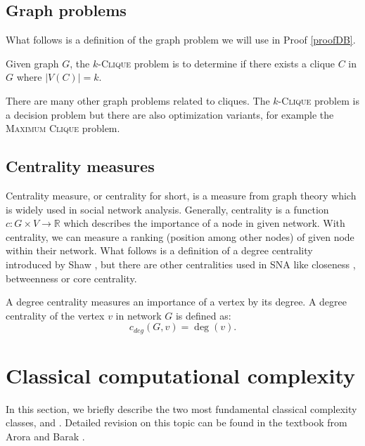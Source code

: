 \subsection{Graph problems}

What follows is a definition of the \NPh graph problem we will use in Proof \ref{proofDB}.

\begin{definition}
    Given graph $G$, the $k$-\textsc{Clique} problem is to determine if
    there exists a clique $C$ in $G$ where $|V(C)| = k$.
\end{definition}

There are many other graph problems related to cliques. The $k$-\textsc{Clique} problem is a decision problem but
there are also optimization variants, for example the \textsc{Maximum Clique} problem.


\subsection{Centrality measures}

Centrality measure, or centrality for short, is a measure from graph theory which is widely used in social network analysis.
Generally, centrality is a function $c: G \times V \rightarrow \mathbb{R}$ which describes the importance of a node in given network.
With centrality, we can measure a ranking (position among other nodes) of given node within their network.
What follows is a definition of a degree centrality introduced by Shaw \cite{Shaw1954}, but there are other centralities used in SNA like
closeness \cite{Beauchamp1965}, betweenness \cite{Anthonisse1971,Freeman1977} or core \cite{Seidman1983} centrality.

\begin{definition}
    A degree centrality measures an importance of a vertex by its degree.
    A degree centrality of the vertex $v$ in network $G$ is defined as:
    $$c_{deg}(G, v) = \deg(v).$$
\end{definition}


\section{Classical computational complexity}

In this section, we briefly describe the two most fundamental classical complexity classes, \Po and \NP.
Detailed revision on this topic can be found in the textbook from Arora and Barak \cite{Arora2009}.

